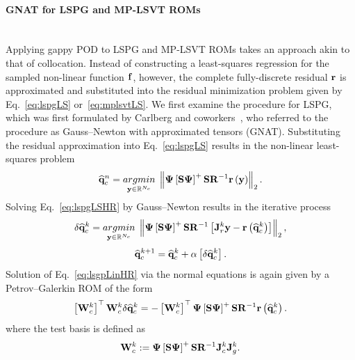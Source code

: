 \paragraph*{GNAT for LSPG and MP-LSVT ROMs}\mbox{}\\
%
Applying gappy POD to LSPG and MP-LSVT ROMs takes an approach akin to that of collocation. Instead of constructing a least-squares regression for the sampled non-linear function $\mathbf{f}$, however, the complete fully-discrete residual $\mathbf{r}$ is approximated and substituted into the residual minimization problem given by Eq.~\ref{eq:lspgLS} or~\ref{eq:mplsvtLS}. We first examine the procedure for LSPG, which was first formulated by Carlberg and coworkers~\cite{Carlberg2010,Carlberg2013}, who referred to the procedure as Gauss--Newton with approximated tensors (GNAT). Substituting the residual approximation into Eq.~\ref{eq:lspgLS} results in the non-linear least-squares problem
%
\begin{equation}\label{eq:lspgLSHR}
    \consVecCoef^{\timeIdx} = \argmin{\dummyVec \inROne{\numConsModes}} \left\Vert \deimBasis \left[ \sampMat \deimBasis \right]^{+} \sampMat \resScaleInv \resFunc{\dummyVec} \right\Vert_2.
\end{equation}
%
Solving Eq.~\ref{eq:lspgLSHR} by Gauss--Newton results in the iterative process
%
\begin{equation}\label{eq:lsgpLinHR}
    \delta \consVecCoef^{\newtonIdx} = \argmin{\dummyVec \inROne{\numConsModes}} \left\Vert \deimBasis \left[ \sampMat \deimBasis \right]^{+} \sampMat \resScaleInv \left[ \jacobRes^{\newtonIdx} \dummyVec - \resFunc{\consVecCoef^{\newtonIdx}}\right] \right\Vert_2,
\end{equation}
\begin{equation}
    \mathbf{\widehat{q}}_{c}^{k + 1} = \mathbf{\widehat{q}}_{c}^{k} + \alpha \left[ \delta \mathbf{\widehat{q}}_{c}^{k} \right].
\end{equation}
%
Solution of Eq.~\ref{eq:lsgpLinHR} via the normal equations is again given by a Petrov--Galerkin ROM of the form
%
\begin{equation}\label{eq:lspgHRSolve}
    \left[ \testBasisCons^\newtonIdx \right]^\top \testBasisCons^\newtonIdx \delta \consVecCoef^{\newtonIdx} = -\left[\testBasisCons^\newtonIdx \right]^\top \deimBasis \left[ \sampMat \deimBasis \right]^{+} \sampMat \resScaleInv \resFunc{\consVecCoef^{\newtonIdx}}.
\end{equation}
%
where the test basis is defined as
%
\begin{equation}\label{eq:lspgHRTest}
    \testBasisCons^\newtonIdx \defEq \deimBasis \left[ \sampMat \deimBasis \right]^{+} \sampMat \resScaleInv \jacobCons^{\newtonIdx} \jacobDecode^{\newtonIdx}.
\end{equation}
